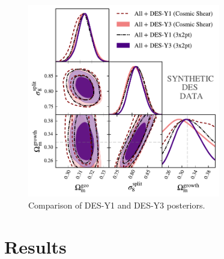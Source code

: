 \begin{figure}[ht]
	\centering
	\includegraphics[width=0.75\textwidth]{plots/plot31v3.pdf}
	\caption{Comparison of DES-Y1 and DES-Y3 posteriors.}
	\label{fig:syn_y1_y3}
\end{figure}
\section{Results}

